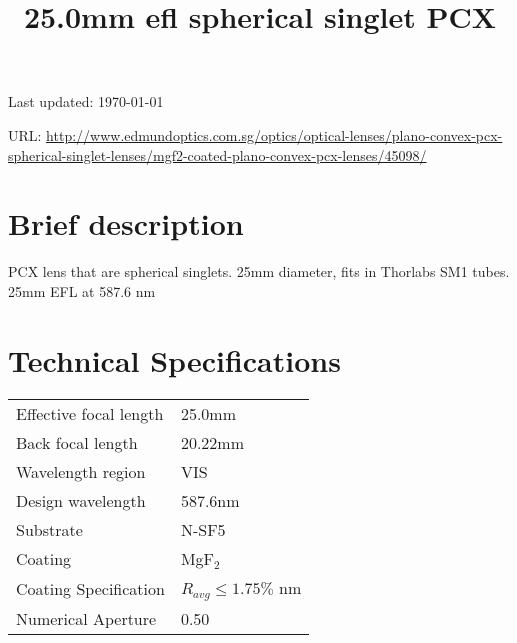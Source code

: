 \documentclass{article}
\title{\vspace{-4cm}25.0mm efl spherical singlet PCX}
\date{}
\begin{document}
\maketitle

\vspace{-1cm}

Last updated: \today

URL: \url{http://www.edmundoptics.com.sg/optics/optical-lenses/plano-convex-pcx-spherical-singlet-lenses/mgf2-coated-plano-convex-pcx-lenses/45098/}

\begin{multicols}{2}

\section{Brief description}

PCX lens that are spherical singlets. 25mm diameter, fits in Thorlabs SM1 tubes. 25mm EFL at 587.6 nm



\section{Technical Specifications}


\begin{tabular}{|l|l|}
  Effective focal length & 25.0mm \\
  Back focal length & 20.22mm\\
  Wavelength region & VIS \\
  Design wavelength & 587.6nm \\
  Substrate & N-SF5 \\
  Coating & MgF$_{2}$ \\
  Coating Specification & $R_{avg} \leq 1.75\%$ nm \\
  Numerical Aperture & 0.50 \\
\end{tabular}%


\end{multicols}
\end{document}
